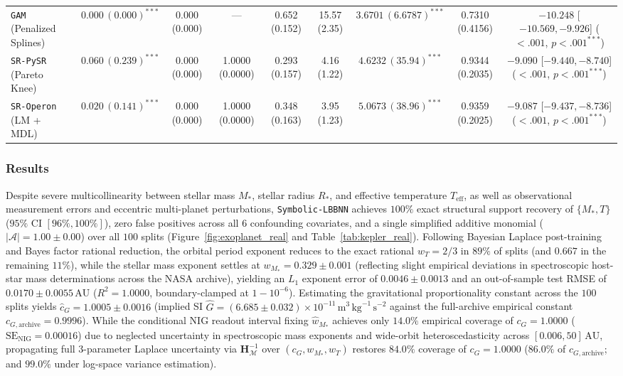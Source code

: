 \documentclass[11pt,a4paper]{article}
\begin{document}
\begin{table}[t!]
{\begin{tabular}{lcccccccc}
\texttt{GAM} (Penalized Splines) & $0.000\,(0.000)^{***}$ & 0.000 (0.000) & --- & 0.652 (0.152) & 15.57 (2.35) & $3.6701\,(6.6787)^{***}$ & 0.7310 (0.4156) & $-10.248$ [$-10.569, -9.926$] ($<.001$, $p < .001^{***}$) \\
\texttt{SR-PySR} (Pareto Knee) & $0.060\,(0.239)^{***}$ & 0.000 (0.000) & 1.0000 (0.0000) & 0.293 (0.157) & 4.16 (1.22) & $4.6232\,(35.94)^{***}$ & 0.9344 (0.2035) & $-9.090$ [$-9.440, -8.740$] ($<.001$, $p < .001^{***}$) \\
\texttt{SR-Operon} (LM + MDL) & $0.020\,(0.141)^{***}$ & 0.000 (0.000) & 1.0000 (0.0000) & 0.348 (0.163) & 3.95 (1.23) & $5.0673\,(38.96)^{***}$ & 0.9359 (0.2025) & $-9.087$ [$-9.437, -8.736$] ($<.001$, $p < .001^{***}$) \\
\bottomrule
\end{tabular}%
}
\end{table}

\subsubsection{Results}
Despite severe multicollinearity between stellar mass $M_*$, stellar radius $R_*$, and effective temperature $T_{\text{eff}}$, as well as observational measurement errors and eccentric multi-planet perturbations, \texttt{Symbolic-LBBNN} achieves $100\%$ exact structural support recovery of $\{M_*, T\}$ ($95\%$ CI $[96\%, 100\%]$), zero false positives across all $6$ confounding covariates, and a single simplified additive monomial ($|\mathcal{A}| = 1.00 \pm 0.00$) over all $100$ splits (Figure~\ref{fig:exoplanet_real} and Table~\ref{tab:kepler_real}). Following Bayesian Laplace post-training and Bayes factor rational reduction, the orbital period exponent reduces to the exact rational $w_T = 2/3$ in $89\%$ of splits (and $0.667$ in the remaining $11\%$), while the stellar mass exponent settles at $w_{M_*} = 0.329 \pm 0.001$ (reflecting slight empirical deviations in spectroscopic host-star mass determinations across the NASA archive), yielding an $L_1$ exponent error of $0.0046 \pm 0.0013$ and an out-of-sample test RMSE of $0.0170 \pm 0.0055\,\text{AU}$ ($R^2 = 1.0000$, boundary-clamped at $1 - 10^{-6}$). Estimating the gravitational proportionality constant across the $100$ splits yields $\hat{c}_G = 1.0005 \pm 0.0016$ (implied SI $\hat{G} = (6.685 \pm 0.032) \times 10^{-11}\,\text{m}^3\,\text{kg}^{-1}\,\text{s}^{-2}$ against the full-archive empirical constant $c_{G,\text{archive}} = 0.9996$). While the conditional NIG readout interval fixing $\hat{w}_{M_*}$ achieves only $14.0\%$ empirical coverage of $c_G = 1.0000$ ($\mathrm{SE}_{\text{NIG}} = 0.00016$) due to neglected uncertainty in spectroscopic mass exponents and wide-orbit heteroscedasticity across $[0.006, 50]\,\text{AU}$, propagating full $3$-parameter Laplace uncertainty via $\bm{H}_{\mathcal{M}}^{-1}$ over $(c_G, w_{M_*}, w_T)$ restores $84.0\%$ coverage of $c_G = 1.0000$ ($86.0\%$ of $c_{G,\text{archive}}$; and $99.0\%$ under log-space variance estimation).
\end{document}
